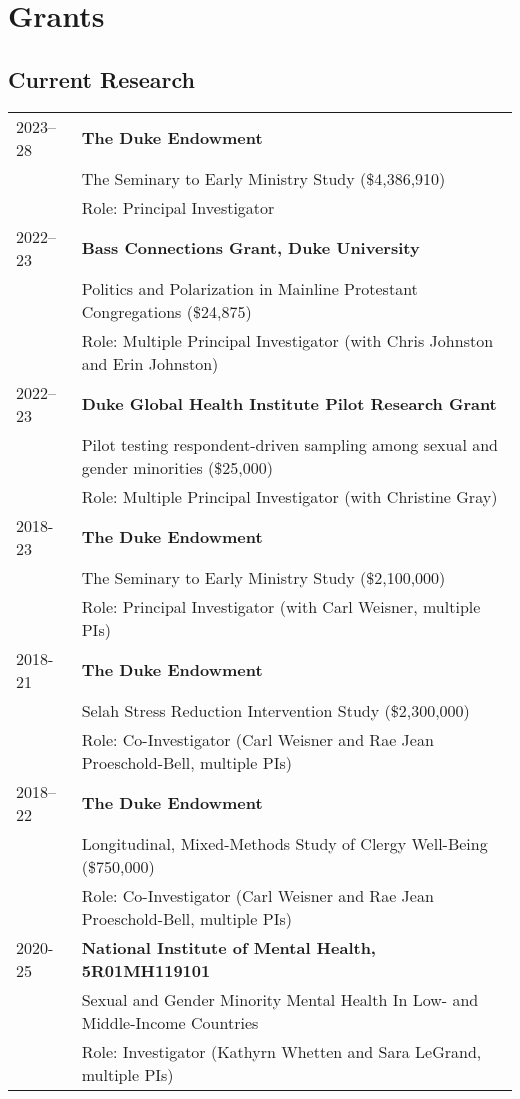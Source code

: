 \newpage
\section*{Grants}
\subsection*{Current Research}
\begin{longtable}{p{} p{}}
	
2023--28 & \textbf{The Duke Endowment}\\
& The Seminary to Early Ministry Study (\$4,386,910)\\
& Role: Principal Investigator\\

2022--23 & \textbf{Bass Connections Grant, Duke University}\\
& Politics and Polarization in Mainline Protestant Congregations (\$24,875)\\
& Role: Multiple Principal Investigator (with Chris Johnston and Erin Johnston)\\

2022--23 & \textbf{Duke Global Health Institute Pilot Research Grant}\\
& Pilot testing respondent-driven sampling among sexual and gender minorities (\$25,000)\\
& Role: Multiple Principal Investigator (with Christine Gray)\\

2018-23 & \textbf{The Duke Endowment}\\
& The Seminary to Early Ministry Study (\$2,100,000)\\
& Role: Principal Investigator (with Carl Weisner, multiple PIs)\\
\vspace{.2em}
2018-21 & \textbf{The Duke Endowment}\\
& Selah Stress Reduction Intervention Study (\$2,300,000)\\
& Role: Co-Investigator (Carl Weisner and Rae Jean Proeschold-Bell, multiple PIs)\\

2018--22 & \textbf{The Duke Endowment}\\
& Longitudinal, Mixed-Methods Study of Clergy Well-Being (\$750,000)\\
& Role: Co-Investigator (Carl Weisner and Rae Jean Proeschold-Bell, multiple PIs)\\

2020-25 & \textbf{National Institute of Mental Health, 5R01MH119101} \\
& Sexual and Gender Minority Mental Health In Low- and Middle-Income Countries \\
& Role: Investigator (Kathyrn Whetten and Sara LeGrand, multiple PIs)\\
\end{longtable}

